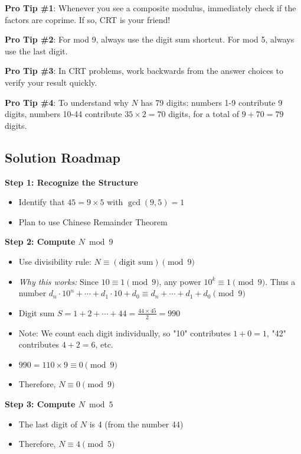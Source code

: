 \documentclass[11pt]{article}
\begin{document}
\begin{tipbox}
\textbf{Pro Tip \#1}: Whenever you see a composite modulus, immediately check if the factors are coprime. If so, CRT is your friend!

\textbf{Pro Tip \#2}: For mod 9, always use the digit sum shortcut. For mod 5, always use the last digit.

\textbf{Pro Tip \#3}: In CRT problems, work backwards from the answer choices to verify your result quickly.

\textbf{Pro Tip \#4}: To understand why $N$ has 79 digits: numbers 1-9 contribute 9 digits, numbers 10-44 contribute $35 \times 2 = 70$ digits, for a total of $9 + 70 = 79$ digits.
\end{tipbox}

\begin{solutionbox}
\subsection*{Solution Roadmap}

\textbf{Step 1: Recognize the Structure}
\begin{itemize}
    \item Identify that $45 = 9 \times 5$ with $\gcd(9,5) = 1$
    \item Plan to use Chinese Remainder Theorem
\end{itemize}

\textbf{Step 2: Compute $N \bmod 9$}
\begin{itemize}
    \item Use divisibility rule: $N \equiv (\text{digit sum}) \pmod{9}$
    \item \textit{Why this works:} Since $10 \equiv 1 \pmod{9}$, any power $10^k \equiv 1 \pmod{9}$. Thus a number $d_n \cdot 10^n + \cdots + d_1 \cdot 10 + d_0 \equiv d_n + \cdots + d_1 + d_0 \pmod{9}$
    \item Digit sum $S = 1+2+\cdots+44 = \frac{44 \times 45}{2} = 990$
    \item Note: We count each digit individually, so "10" contributes $1+0=1$, "42" contributes $4+2=6$, etc.
    \item $990 = 110 \times 9 \equiv 0 \pmod{9}$
    \item Therefore, $N \equiv 0 \pmod{9}$
\end{itemize}

\textbf{Step 3: Compute $N \bmod 5$}
\begin{itemize}
    \item The last digit of $N$ is 4 (from the number 44)
    \item Therefore, $N \equiv 4 \pmod{5}$
\end{itemize}


\end{solutionbox}
\end{document}
